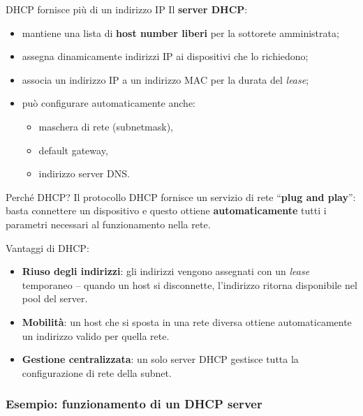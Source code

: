 \documentclass[a4paper,12pt]{report}
\begin{document}
\begin{notebox}{DHCP fornisce più di un indirizzo IP}
Il \textbf{server DHCP}:
\begin{itemize}
    \item mantiene una lista di \textbf{host number liberi} per la sottorete amministrata;
    \item assegna dinamicamente indirizzi IP ai dispositivi che lo richiedono;
    \item associa un indirizzo IP a un indirizzo MAC per la durata del \textit{lease};
    \item può configurare automaticamente anche:
    \begin{itemize}
        \item maschera di rete (subnetmask),
        \item default gateway,
        \item indirizzo server DNS.
    \end{itemize}
\end{itemize}
\end{notebox}


\begin{notebox}{Perché DHCP?}
Il protocollo DHCP fornisce un servizio di rete “\textbf{plug and play}”:  
basta connettere un dispositivo e questo ottiene \textbf{automaticamente} tutti i parametri necessari al funzionamento nella rete.

\vspace{0.5cm}
Vantaggi di DHCP:
\begin{itemize}
    \item \textbf{Riuso degli indirizzi}: gli indirizzi vengono assegnati
          con un \textit{lease} temporaneo -- quando un host si
          disconnette, l'indirizzo ritorna disponibile nel pool del server.
    \item \textbf{Mobilità}: un host che si sposta in una rete diversa
          ottiene automaticamente un indirizzo valido per quella rete.
    \item \textbf{Gestione centralizzata}: un solo server DHCP gestisce
          tutta la configurazione di rete della subnet.
\end{itemize}
\end{notebox}

\newpage
\subsubsection*{Esempio: funzionamento di un DHCP server}
\end{document}

